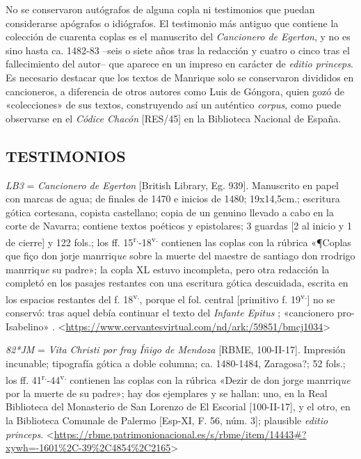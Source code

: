 \documentclass[11pt,a4paper,twoside]{article}
\newcommand{\comillas}[1]{«#1»}
\newcommand{\tsup}[1]{\textsuperscript{#1}}
\begin{document}
%
No se conservaron autógrafos de alguna copla ni testimonios que puedan considerarse apógrafos o idiógrafos. El testimonio más antiguo que contiene la colección de cuarenta coplas es el manuscrito del \textit{Cancionero de Egerton}, y no es sino hasta ca. 1482-83 --seis o siete años tras la redacción y cuatro o cinco tras el fallecimiento del autor-- que aparece en un impreso en carácter de \textit{editio princeps}. Es necesario destacar que los textos de Manrique solo se conservaron divididos en cancioneros, a diferencia de otros autores como Luis de Góngora, quien gozó de \comillas{colecciones} de sus textos, construyendo así un auténtico \textit{corpus}, como puede observarse en el \textit{Códice Chacón} [RES/45] en la Biblioteca Nacional de España.\par

\subsection*{\fontsize{11}{14}\selectfont TESTIMONIOS}

\textit{LB3} = \textit{Cancionero de Egerton} [British Library, Eg. 939].
%
Manuscrito en papel con marcas de agua; de finales de 1470 e inicios de 1480; 19x14,5cm.; escritura gótica cortesana, copista castellano; copia de un genuino llevado a cabo en la corte de Navarra; contiene textos poéticos y epistolares; 3 guardas [2 al inicio y 1 de cierre] y 122 fols.; los ff. 15\tsup{r.}-18\tsup{v.} contienen las coplas con la rúbrica \comillas{¶Coplas que fiço don jorje manrriq\textit{ue} sobre la muerte del maestre de santiago don rrodrigo manrriq\textit{ue} su padre}; la copla XL estuvo incompleta, pero otra redacción la completó en los pasajes restantes con una escritura gótica descuidada, escrita en los espacios restantes del f. 18\tsup{v.}, porque el fol. central [primitivo f. 19\tsup{v.}] no se conservó: tras aquel debía continuar el texto del \textit{Infante Epitus} \textcite{Beltrán2011}; \comillas{cancionero pro-Isabelino} \parencite{Severin2000}. <\url{https://www.cervantesvirtual.com/nd/ark:/59851/bmcj1034}>\par

\textit{82*JM} = \textit{Vita Christi por fray Íñigo de Mendoza} [RBME, 100-II-17].
%
Impresión incunable; tipografía gótica a doble columna; ca. 1480-1484, Zaragosa?; 52 fols.; los ff. 41\tsup{r.}-44\tsup{v.} contienen las coplas con la rúbrica \comillas{Dezir de don jorge manrriq\textit{ue} por la muerte de su padre}; hay dos ejemplares y se hallan: uno, en la Real Biblioteca del Monasterio de San Lorenzo de El Escorial [100-II-17], y el otro, en la Biblioteca Comunale de Palermo [Esp-XI, F. 56, núm. 3]; plausible \textit{editio princeps}. <\url{https://rbme.patrimonionacional.es/s/rbme/item/14443#?xywh=-1601%2C-39%2C4854%2C2165}>\par
\end{document}
